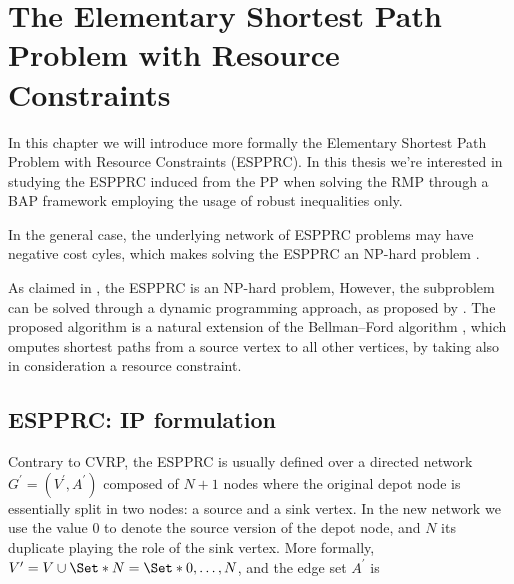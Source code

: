 \chapter{The Elementary Shortest Path Problem with Resource Constraints}
In this chapter we will introduce more formally the Elementary Shortest Path Problem with Resource Constraints (ESPPRC).
In this thesis we're interested in studying the ESPPRC induced from the PP when solving the RMP through a BAP framework employing the usage of robust inequalities only.

In the general case, the underlying network of ESPPRC problems may have negative cost cyles, which makes solving the ESPPRC an NP-hard problem \parencite{dror1994}.

As claimed in \textcite{dror1994}, the ESPPRC is an NP-hard problem,
However, the subproblem can be solved through a dynamic programming approach, as proposed by \textcite{feillet2004}.
The proposed algorithm is a natural extension of the Bellman–Ford algorithm \parencite{bellman1958, fordjr1956},
which omputes shortest paths from a source vertex to all other vertices,
by taking also in consideration a resource constraint.

\begin{comment}
\cite{bettinelli2010mathematical} ---------------
It is possible to address the pricing problem by optimizing its relaxation,
obtained by dropping the elementarity constraints. Solving a resource con-
strained shortest path problem (RCSPP) requires less computing time but
yields less tight lower bounds, since columns may include cycles. The two
different approaches have been followed for instance by Feillet et al. [42] and
Desrochers et al. [29] to solve the vehicle routing problem with time windows
(VRPTW) through column generation.
\end{comment}

\section{ESPPRC: IP formulation}
Contrary to CVRP, the ESPPRC is usually defined over a directed network $G^\prime = (V^\prime, A^\prime)$ composed
of $N + 1$ nodes where the original depot node is essentially split in two nodes: a source and a sink vertex.
In the new network we use the value $0$ to denote the source version of the depot node, and $N$ its duplicate
playing the role of the sink vertex.
More formally, $V^\prime = V \cup \Set*{N} = \Set*{ 0,\dots, N }$, and the edge set $A^\prime$ is

